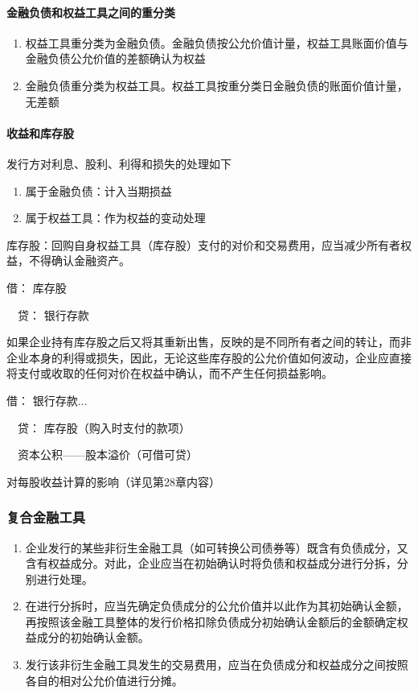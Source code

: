 \documentclass[UTF8,12pt]{ctexart}
\newenvironment{Dr}{\noindent 借：}{\par}
\newenvironment{Cr}{\noindent \ \ 贷：}{\par}
\numberwithin{equation}{section} %
\numberwithin{figure}{section}
\numberwithin{table}{section}
\begin{document}
	\paragraph{金融负债和权益工具之间的重分类}
	\begin{enumerate}
		\item 权益工具重分类为金融负债。金融负债按公允价值计量，权益工具账面价值与金融负债公允价值的差额确认为权益 
		
		\item 金融负债重分类为权益工具。权益工具按重分类日金融负债的账面价值计量，无差额
	\end{enumerate}
	
	\paragraph{收益和库存股}
	发行方对利息、股利、利得和损失的处理如下
	\begin{enumerate}
		\item 属于金融负债：计入当期损益
		
		\item 属于权益工具：作为权益的变动处理
	\end{enumerate}

	库存股：回购自身权益工具（库存股）支付的对价和交易费用，应当减少所有者权益，不得确认金融资产。
	
	\begin{Dr}
		库存股
	\end{Dr}
	\begin{Cr}
		银行存款
	\end{Cr}
	
	如果企业持有库存股之后又将其重新出售，反映的是不同所有者之间的转让，而非企业本身的利得或损失，因此，无论这些库存股的公允价值如何波动，企业应直接将支付或收取的任何对价在权益中确认，而不产生任何损益影响。
	
	\begin{Dr}
		银行存款...
	\end{Dr}
	\begin{Cr}
		库存股（购入时支付的款项）
		
		\ \ 资本公积——股本溢价（可借可贷）
	\end{Cr}
	
	
	对每股收益计算的影响（详见第28章内容）
	
	\subsubsection{复合金融工具}
	\begin{enumerate}
		\item 企业发行的某些非衍生金融工具（如可转换公司债券等）既含有负债成分，又含有权益成分。对此，企业应当在初始确认时将负债和权益成分进行分拆，分别进行处理。
		
		\item 在进行分拆时，应当先确定负债成分的公允价值并以此作为其初始确认金额，再按照该金融工具整体的发行价格扣除负债成分初始确认金额后的金额确定权益成分的初始确认金额。
		
		\item 发行该非衍生金融工具发生的交易费用，应当在负债成分和权益成分之间按照各自的相对公允价值进行分摊。
	\end{enumerate}
	
\end{document}
